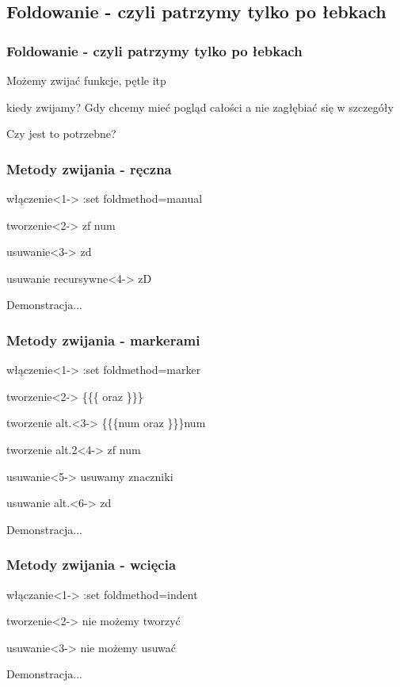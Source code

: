 \documentclass{beamer}
\begin{document}
\subsection{Foldowanie - czyli patrzymy tylko po łebkach}
\begin{frame}
	\frametitle{Foldowanie - czyli patrzymy tylko po łebkach}
	{
		Możemy zwijać funkcje, pętle itp\\
	}
	\uncover<2->
	{
		\begin{block}{kiedy zwijamy?}
			Gdy chcemy mieć pogląd całości a nie zagłębiać się w szczegóły
		\end{block}
	}
	{
		Czy jest to potrzebne?
	}
\end{frame}
\begin{frame}
	\frametitle{Metody zwijania - ręczna}
	\begin{block}{włączenie}<1->
	:set foldmethod=manual
	\end{block}
	\begin{block}{tworzenie}<2->
	zf num
	\end{block}
	\begin{block}{usuwanie}<3->
	zd
	\end{block}
	\begin{block}{usuwanie recursywne}<4->
	zD
	\end{block}
	{
		Demonstracja...
	}
\end{frame}
\begin{frame}
	\frametitle{Metody zwijania - markerami}
	\begin{block}{włączenie}<1->
	:set foldmethod=marker
	\end{block}
	\begin{block}{tworzenie}<2->
	\{\{\{ oraz \}\}\}
	\end{block}
	\begin{block}{tworzenie alt.}<3->
	\{\{\{num oraz \}\}\}num
	\end{block}
	\begin{block}{tworzenie alt.2}<4->
	zf num
	\end{block}
	\begin{block}{usuwanie}<5->
	usuwamy znaczniki
	\end{block}
	\begin{block}{usuwanie alt.}<6->
	zd
	\end{block}
	{
		Demonstracja...
	}
\end{frame}
\begin{frame}
	\frametitle{Metody zwijania - wcięcia}
	\begin{block}{włączanie}<1->
	:set foldmethod=indent
	\end{block}
	\begin{block}{tworzenie}<2->
	nie możemy tworzyć
	\end{block}
	\begin{block}{usuwanie}<3->
	nie możemy usuwać
	\end{block}
	{
		Demonstracja...
	}
\end{frame}
\end{document}

